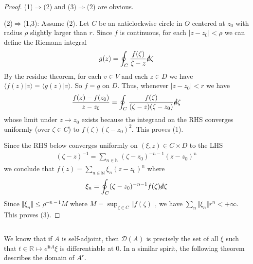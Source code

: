 \documentclass[12pt,b5paper,notitlepage]{article}
\theoremstyle{definition}
\theoremstyle{plain}
\newcommand{\Dom}{\scr{D}}
\newcommand{\bk}[1]{\langle {#1}\rangle}
\newcommand{\scr}{\mathscr}
\newcommand{\im}{\mathbf{i}}
\newcommand{\Nbb}{\mathbb N}
\newcommand{\Rbb}{\mathbb R}
\newcommand{\ointn}{\oint\nolimits}
\newcommand{\sd}{\slashed{d}}
\numberwithin{equation}{section}
\begin{document}
\begin{proof}
(1)$\Rightarrow$(2) and (3)$\Rightarrow$(2) are obvious.

(2)$\Rightarrow$(1,3): Assume (2). Let $C$ be an anticlockwise circle in $O$ centered at $z_0$ with radius $\rho$ slightly larger than $r$. Since $f$ is continuous, for each $|z-z_0|<\rho$ we can define the Riemann integral
\begin{align*}
g(z)=\ointn_C \frac{f(\zeta)}{\zeta-z}\sd\zeta
\end{align*}
By the residue theorem, for each $v\in V$ and each $z\in D$ we have $\bk{f(z)|v}=\bk{g(z)|v}$. So $f=g$ on $D$. Thus, whenever $|z-z_0|<r$ we have
\begin{align*}
\frac{f(z)-f(z_0)}{z-z_0}=\ointn_C\frac{f(\zeta)}{(\zeta-z)(\zeta-z_0)}\sd\zeta
\end{align*}
whose limit under $z\rightarrow z_0$ exists because the integrand on the RHS converges uniformly (over $\zeta\in C$) to $f(\zeta)(\zeta-z_0)^2$. This proves (1). 

Since the RHS below converges uniformly on $(\xi,z)\in C\times D$ to the LHS
\begin{align*}
(\zeta-z)^{-1}=\sum_{n\in\Nbb}(\zeta-z_0)^{-n-1}(z-z_0)^n
\end{align*}
we conclude that $f(z)=\sum_{n\in\Nbb}\xi_n(z-z_0)^n$ where
\begin{align*}
\xi_n=\ointn_C(\zeta-z_0)^{-n-1}f(\zeta)\sd\zeta
\end{align*} 
Since $\Vert\xi_n\Vert\leq \rho^{-n-1}M$ where $M=\sup_{\zeta\in C}\Vert f(\zeta)\Vert$, we have $\sum_n\Vert\xi_n\Vert r^n<+\infty$. This proves (3).
\end{proof}









\subsection{}

We know that if $A$ is self-adjoint, then $\Dom(A)$ is precisely the set of all $\xi$ such that $t\in\Rbb\mapsto e^{\im tA}\xi$ is differentiable at $0$. In a similar spirit, the following theorem describes the domain of $A^r$.
\end{document}
